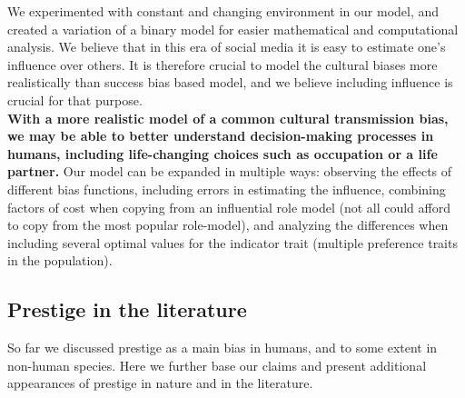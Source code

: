 \documentclass[12pt]{extarticle}
\begin{document}
We experimented with constant and changing environment in our model, and created a variation of a binary model for easier mathematical and computational analysis.
We believe that in this era of social media it is easy to estimate one's influence over others.
It is therefore crucial to model the cultural biases more realistically than success bias based model, and we believe including influence is crucial for that purpose.\\
\textbf{With a more realistic model of a common cultural transmission bias, we may be able to better understand decision-making processes in humans, including life-changing choices such as occupation or a life partner.} 
Our model can be expanded in multiple ways: observing the effects of different bias functions, including errors in estimating the influence, combining factors of cost when copying from an influential role model (not all could afford to copy from the most popular role-model), and analyzing the differences when including several optimal values for the indicator trait (multiple preference traits in the population).

\subsection*{Prestige in the literature}
So far we discussed prestige as a main bias in humans, and to some extent in non-human species. Here we further base our claims and present additional appearances of prestige in nature and in the literature. \\
\end{document}
